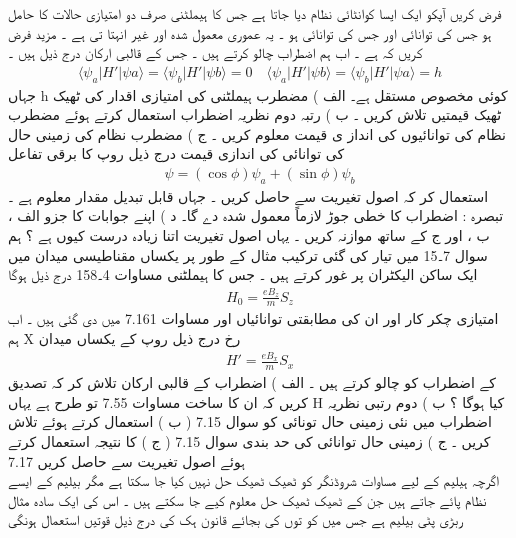 فرض کریں آپکو ایک ایسا کوانٹائی نظام دیا جاتا ہے جس کا ہیملٹنی  صرف دو امتیازی حالات کا حامل ہو  جس کی توانائی  اور  جس کی توانائی  ہو ۔ یہ عموری معمول شدہ اور غیر انہتا تی ہے ۔ مزید فرض کریں کہ  ہے ۔ اب ہم اضطراب  چالو کرتے ہیں ۔ جس کے قالبی ارکان درج ذیل ہیں ۔
\begin{align}
\langle \psi_{a}|H'|\psi{a}\rangle=\langle \psi_{b}|H'|\psi{b}\rangle=0\quad \langle \psi_{a}|H'|\psi{b}\rangle=\langle \psi_{b}|H'|\psi{a}\rangle=h
\end{align}
 جہاں h کوئی مخصوص مستقل ہے۔
الف ) مضطرب ہیملٹنی کی امتیازی اقدار کی ٹھیک ٹھیک قیمتیں تلاش کریں ۔
ب ) رتبہ دوم نظریہ اضطراب استعمال کرتے ہوئے مضطرب نظام کی توانائیوں کی انداز ی قیمت معلوم کریں ۔
ج ) مضطرب نظام کی زمینی حال کی توانائی کی اندازی قیمت درج ذیل روپ کا برقی تفاعل
\begin{align}
\psi=(\cos{\phi})\psi_{a}+(\sin{\phi})\psi_{b} 
\end{align}
 استعمال کر کہ اصول تغیریت سے حاصل کریں ۔ جہاں  قابل تبدیل مقدار معلوم ہے ۔
تبصرہ : اضطراب کا خطی جوڑ لازماً معمول شدہ دے گا۔
د ) اپنے جوابات کا جزو الف ، ب ، اور ج کے ساتھ موازنہ کریں ۔ یہاں اصول تغیریت اتنا زیادہ درست کیوں ہے ؟
ہم سوال 7۔15 میں تیار کی گئی ترکیب مثال کے طور پر یکساں مقناطیسی میدان  میں ایک ساکن الیکٹران پر غور کرتے ہیں ۔ جس کا ہیملٹنی مساوات 4۔158 درج ذیل ہوگا
\begin{align}
H_{0}=\frac{eB_{z}}{m}S_{z} 
\end{align}
 امتیازی چکر کار  اور  ان کی مطابقتی توانائیاں  اور  مساوات 7.161 میں دی گئی ہیں ۔
اب ہم X رخ درج ذیل روپ کے یکساں میدان
\begin{align}
H'=\frac{eB_{x}}{m}S_{x} 
\end{align}
 کے اضطراب کو چالو کرتے ہیں ۔
الف ) اضطراب  کے قالبی ارکان تلاش کر کہ تصدیق کریں کہ ان کا ساخت مساوات 7.55 تو طرح ہے یہاں H کیا ہوگا ؟
ب ) دوم رتبی نظریہ اضطراب میں نئی زمینی حال تونائی کو سوال 7.15 ( ب ) استعمال کرتے ہوئے تلاش کریں ۔
ج ) زمینی حال توانائی کی حد بندی سوال 7.15 ( ج ) کا نتیجہ استعمال کرتے ہوئے اصول تغیریت سے حاصل کریں
7.17\\
اگرچہ ہیلیم کے لیے مساوات شروڈنگر کو ٹھیک ٹھیک حل نہیں کیا جا سکتا ہے مگر بیلیم کے ایسے نظام پائے جاتے ہیں جن کے ٹھیک ٹھیک حل معلوم کیے جا سکتے ہیں ۔ اس کی ایک  سادہ مثال ربڑی پٹی بیلیم ہے جس میں کو توں کی بجائے قانون ہک کی درج ذیل قوتیں استعمال ہونگی
